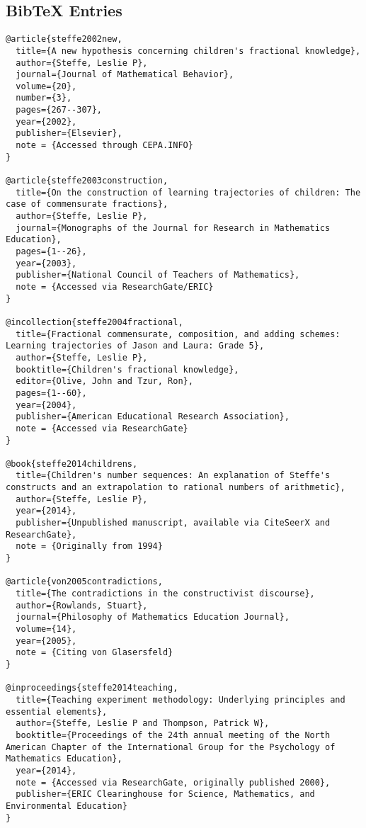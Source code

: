 \documentclass{article}
\begin{document}
\newpage
\subsection*{BibTeX Entries}
\begin{verbatim}
@article{steffe2002new,
  title={A new hypothesis concerning children's fractional knowledge},
  author={Steffe, Leslie P},
  journal={Journal of Mathematical Behavior},
  volume={20},
  number={3},
  pages={267--307},
  year={2002},
  publisher={Elsevier},
  note = {Accessed through CEPA.INFO}
}

@article{steffe2003construction,
  title={On the construction of learning trajectories of children: The case of commensurate fractions},
  author={Steffe, Leslie P},
  journal={Monographs of the Journal for Research in Mathematics Education},
  pages={1--26},
  year={2003},
  publisher={National Council of Teachers of Mathematics},
  note = {Accessed via ResearchGate/ERIC}
}

@incollection{steffe2004fractional,
  title={Fractional commensurate, composition, and adding schemes: Learning trajectories of Jason and Laura: Grade 5},
  author={Steffe, Leslie P},
  booktitle={Children's fractional knowledge},
  editor={Olive, John and Tzur, Ron},
  pages={1--60},
  year={2004},
  publisher={American Educational Research Association},
  note = {Accessed via ResearchGate}
}

@book{steffe2014childrens,
  title={Children's number sequences: An explanation of Steffe's constructs and an extrapolation to rational numbers of arithmetic},
  author={Steffe, Leslie P},
  year={2014},
  publisher={Unpublished manuscript, available via CiteSeerX and ResearchGate},
  note = {Originally from 1994}
}

@article{von2005contradictions,
  title={The contradictions in the constructivist discourse},
  author={Rowlands, Stuart},
  journal={Philosophy of Mathematics Education Journal},
  volume={14},
  year={2005},
  note = {Citing von Glasersfeld}
}

@inproceedings{steffe2014teaching,
  title={Teaching experiment methodology: Underlying principles and essential elements},
  author={Steffe, Leslie P and Thompson, Patrick W},
  booktitle={Proceedings of the 24th annual meeting of the North American Chapter of the International Group for the Psychology of Mathematics Education},
  year={2014},
  note = {Accessed via ResearchGate, originally published 2000},
  publisher={ERIC Clearinghouse for Science, Mathematics, and Environmental Education}
}

\end{verbatim}
\end{document}
